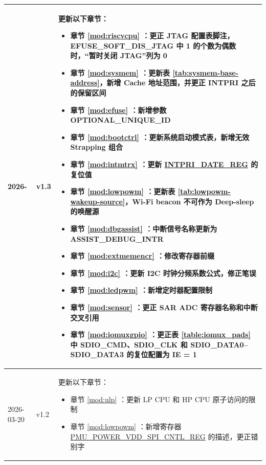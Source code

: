 \begin{longtable}[l]{ | m{2cm} | m{1.5cm} | m{12cm} | }
    2026- & v1.3 &
    更新以下章节：
    \begin{itemize}
        \item 章节 \ref{mod:riscvcpu} \textit{\nameref{mod:riscvcpu}}：更正 JTAG 配置表脚注，EFUSE\_SOFT\_DIS\_JTAG 中 1 的个数为偶数时，“暂时关闭 JTAG”列为 0
        \item 章节 \ref{mod:sysmem} \textit{\nameref{mod:sysmem}}：更新表 \ref{tab:sysmem-base-address}，新增 Cache 地址范围，并更正 INTPRI 之后的保留区间 %
        \item 章节 \ref{mod:efuse} \textit{\nameref{mod:efuse}}：新增参数 OPTIONAL\_UNIQUE\_ID %
        \item 章节 \ref{mod:bootctrl} \textit{\nameref{mod:bootctrl}}：更新系统启动模式表，新增无效 Strapping 组合 %
        \item 章节 \ref{mod:intmtrx} \textit{\nameref{mod:intmtrx}}：更新 \hyperref[regdesc:INTPRIDATEREG]{INTPRI\_DATE\_REG} 的复位值 %
        \item 章节 \ref{mod:lowpowm} \textit{\nameref{mod:lowpowm}}：更新表 \ref{tab:lowpowm-wakeup-source}，Wi-Fi beacon 不可作为 Deep-sleep 的唤醒源 %
        \item 章节 \ref{mod:dbgassist} \textit{\nameref{mod:dbgassist}}：中断信号名称更新为 ASSIST\_DEBUG\_INTR %
        \item 章节 \ref{mod:extmemencr} \textit{\nameref{mod:extmemencr}}：修改寄存器前缀
        \item 章节 \ref{mod:i2c} \textit{\nameref{mod:i2c}}：更新 I2C 时钟分频系数公式，修正笔误 %
        \item 章节 \ref{mod:ledpwm} \textit{\nameref{mod:ledpwm}}：新增定时器配置限制 %
        \item 章节 \ref{mod:sensor} \textit{\nameref{mod:sensor}}：更正 SAR ADC 寄存器名称和中断交叉引用 %
        \item 章节 \ref{mod:iomuxgpio} \textit{\nameref{mod:iomuxgpio}}：更正表 \ref{table:iomux_pads} 中 SDIO\_CMD、SDIO\_CLK 和 SDIO\_DATA0--SDIO\_DATA3 的复位配置为 IE = 1
    \end{itemize}
    \\\hline
    2026-03-20 & v1.2 &
    更新以下章节：
    \begin{itemize}
        \item 章节 \ref{mod:ulp} \textit{\nameref{mod:ulp}}：更新 LP CPU 和 HP CPU 原子访问的限制 %
        \item 章节 \ref{mod:lowpowm} \textit{\nameref{mod:lowpowm}}：新增寄存器 \hyperref[regdesc:PMUPOWERVDDSPICNTLREG]{PMU\_POWER\_VDD\_SPI\_CNTL\_REG} 的描述，更正错别字 %

\end{itemize}
\end{longtable}
